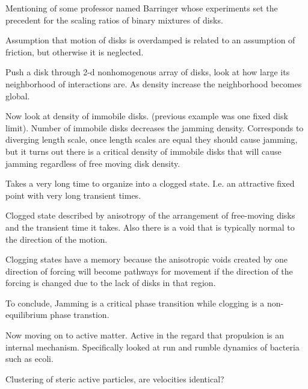 \begin{description}
{\begin{description}
Mentioning of some professor named Barringer whose experiments set the precedent
for the scaling ratios of binary mixtures of disks.

Assumption that motion of disks is overdamped is related to an assumption of friction,
but otherwise it is neglected.

Push a disk through 2-d nonhomogenous array of disks, look at how large its neighborhood
of interactions are. As density increase the neighborhood becomes global.

Now look at density of immobile disks. (previous example was one fixed disk limit).
Number of immobile disks decreases the jamming density. Corresponds to diverging length scale,
once length scales are equal they should cause jamming, but it turns out there is a critical
density of immobile disks that will cause jamming regardless of free moving disk density.

Takes a very long time to organize into a clogged state. I.e. an attractive fixed point with
very long transient times.

Clogged state described by anisotropy of the arrangement of free-moving disks and the transient
time it takes. Also there is a void that is typically normal to the direction of the motion.

Clogging states have a memory because the anisotropic voids created by one direction of
forcing will become pathways for movement if the direction of the forcing is changed due
to the lack of disks in that region.

To conclude, Jamming is a critical phase transition while clogging is a non-equilibrium
phase transtion.

Now moving on to active matter. Active in the regard that propulsion is an internal
mechanism. Specifically looked at run and rumble dynamics of bacteria such as ecoli.

Clustering of steric active particles, are velocities identical?

\end{description}
}

\end{description}
